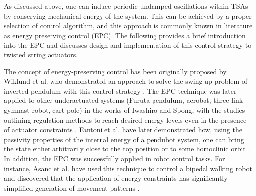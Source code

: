 As discussed above, one can induce periodic undamped oscillations within TSAs by conserving mechanical energy of the system. This can be achieved by a proper selection of control algorithm, and this approach is commonly known in literature as energy preserving control (EPC). The following provides a brief introduction into the EPC and discusses design and implementation of this control strategy to twisted string actuators.

The concept of energy-preserving control has been originally proposed by Wiklund et al. who demonstrated an approach to solve the swing-up problem of inverted pendulum with this control strategy \cite{wiklund1993new}. The EPC technique was later applied to other underactuated systems (Furuta pendulum, acrobot, three-link gymnast robot, cart-pole) in the works of Iwashiro and Spong, with the studies outlining regulation methods to reach desired energy levels even in the presence of actuator constraints \cite{iwashiro1996energy,spong1996energy}.
Fantoni et al. have later demonstrated how, using the passivity properties of the internal energy of a pendubot system, one can bring the state either arbitrarily close to the top position or to some homoclinic orbit  \cite{fantoni2000energy}. %
In addition, the EPC was successfully applied in robot control tasks. For instance, Asano et al. have used this technique to control a bipedal walking robot and discovered that the application of energy constraints has significantly simplified generation of movement patterns \cite{asano2004novel}.

